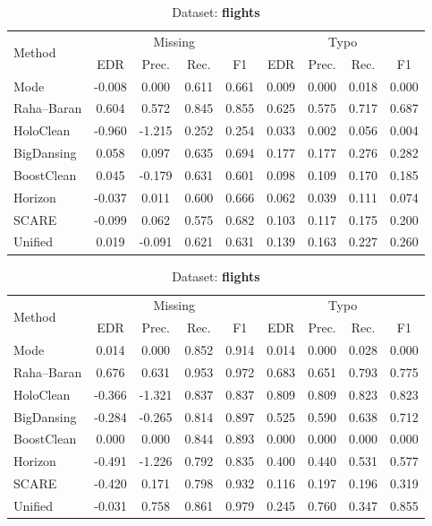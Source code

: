 \documentclass[10pt]{article} %
\numberwithin{equation}{section}
\begin{document}
\begin{table}[htbp]
\begin{subtable}[t]{0.492\linewidth}
\caption{Dataset: \textbf{beers}}
\label{tab:q1-acc-beers}
\centering
\begin{tabular}{lcccccccc}
\toprule
\multirow{2}{*}{Method} &
\multicolumn{4}{c}{Missing} &
\multicolumn{4}{c}{Typo}\\
\cmidrule(lr){2-5}\cmidrule(l){6-9}
 & EDR & Prec. & Rec. & F1
 & EDR & Prec. & Rec. & F1\\
\midrule
Mode & -0.008 & 0.000 & 0.611 & 0.661 & 0.009 & 0.000 & 0.018 & 0.000 \\
Raha–Baran & 0.604 & 0.572 & 0.845 & 0.855 & 0.625 & 0.575 & 0.717 & 0.687 \\
HoloClean & -0.960 & -1.215 & 0.252 & 0.254 & 0.033 & 0.002 & 0.056 & 0.004 \\
BigDansing & 0.058 & 0.097 & 0.635 & 0.694 & 0.177 & 0.177 & 0.276 & 0.282 \\
BoostClean & 0.045 & -0.179 & 0.631 & 0.601 & 0.098 & 0.109 & 0.170 & 0.185 \\
Horizon & -0.037 & 0.011 & 0.600 & 0.666 & 0.062 & 0.039 & 0.111 & 0.074 \\
SCARE & -0.099 & 0.062 & 0.575 & 0.682 & 0.103 & 0.117 & 0.175 & 0.200 \\
Unified & 0.019 & -0.091 & 0.621 & 0.631 & 0.139 & 0.163 & 0.227 & 0.260 \\
\bottomrule
\end{tabular}
\end{subtable}\hspace{0.01\linewidth}
%
\begin{subtable}[t]{0.492\linewidth}
\caption{Dataset: \textbf{flights}}
\label{tab:q1-acc-flights}
\centering
\begin{tabular}{lcccccccc}
\toprule
\multirow{2}{*}{Method} &
\multicolumn{4}{c}{Missing} &
\multicolumn{4}{c}{Typo}\\
\cmidrule(lr){2-5}\cmidrule(l){6-9}
 & EDR & Prec. & Rec. & F1
 & EDR & Prec. & Rec. & F1\\
\midrule
Mode & 0.014 & 0.000 & 0.852 & 0.914 & 0.014 & 0.000 & 0.028 & 0.000 \\
Raha–Baran & 0.676 & 0.631 & 0.953 & 0.972 & 0.683 & 0.651 & 0.793 & 0.775 \\
HoloClean & -0.366 & -1.321 & 0.837 & 0.837 & 0.809 & 0.809 & 0.823 & 0.823 \\
BigDansing & -0.284 & -0.265 & 0.814 & 0.897 & 0.525 & 0.590 & 0.638 & 0.712 \\
BoostClean & 0.000 & 0.000 & 0.844 & 0.893 & 0.000 & 0.000 & 0.000 & 0.000 \\
Horizon & -0.491 & -1.226 & 0.792 & 0.835 & 0.400 & 0.440 & 0.531 & 0.577 \\
SCARE & -0.420 & 0.171 & 0.798 & 0.932 & 0.116 & 0.197 & 0.196 & 0.319 \\
Unified & -0.031 & 0.758 & 0.861 & 0.979 & 0.245 & 0.760 & 0.347 & 0.855 \\
\bottomrule
\end{tabular}
\end{subtable}


\end{table}
\end{document}
